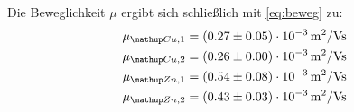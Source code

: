 Die Beweglichkeit $\mu$ ergibt sich schließlich mit \eqref{eq:beweg} zu:
\begin{align}
\begin{aligned}
\mu\ua{Cu,1} &= (0.27 \pm 0.05)\cdot 10^{-3} \, \si{\meter^2 \per \volt \second}  \\%
\mu\ua{Cu,2} &= (0.26 \pm 0.00)\cdot 10^{-3} \, \si{\meter^2 \per \volt \second}  \\
\mu\ua{Zn,1} &= (0.54 \pm 0.08)\cdot 10^{-3} \, \si{\meter^2 \per \volt \second}  \\
\mu\ua{Zn,2} &= (0.43 \pm 0.03)\cdot 10^{-3} \, \si{\meter^2 \per \volt \second}
\end{aligned}
\end{align}

